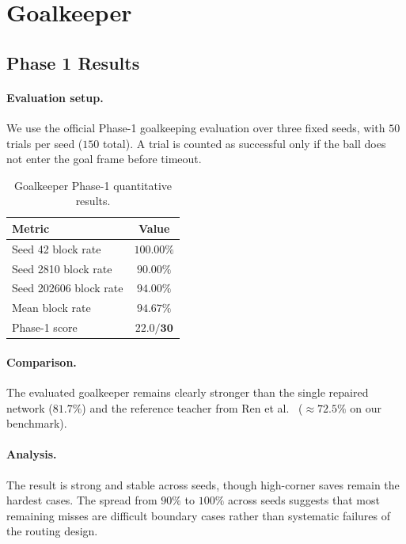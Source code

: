 \documentclass{article}
\begin{document}
\section{Goalkeeper}\label{part:keeper}

\subsection{Phase 1 Results}\label{sec:gk-results}

\paragraph{Evaluation setup.} We use the official Phase-1 goalkeeping
evaluation over three fixed seeds, with $50$ trials per seed ($150$ total). A
trial is counted as successful only if the ball does not enter the goal frame
before timeout.

\begin{table}[h]
\centering\small
\caption{Goalkeeper Phase-1 quantitative results.}
\label{tab:gk-phase1-summary}
\begin{tabular}{@{}lc@{}}
\toprule
Metric & Value \\
\midrule
Seed 42 block rate & $100.00\%$ \\
Seed 2810 block rate & $90.00\%$ \\
Seed 202606 block rate & $94.00\%$ \\
Mean block rate & $\mathbf{94.67\%}$ \\
Phase-1 score & $\mathbf{22.0/30}$ \\
\bottomrule
\end{tabular}
\end{table}

\paragraph{Comparison.} The evaluated goalkeeper remains clearly stronger than
the single repaired network ($81.7\%$) and the reference teacher from
Ren et al.~\cite{ren} ($\approx 72.5\%$ on our benchmark).

\paragraph{Analysis.} The result is strong and stable across seeds, though
high-corner saves remain the hardest cases. The spread from $90\%$ to $100\%$
across seeds suggests that most remaining misses are difficult boundary cases
rather than systematic failures of the routing design.
\end{document}
